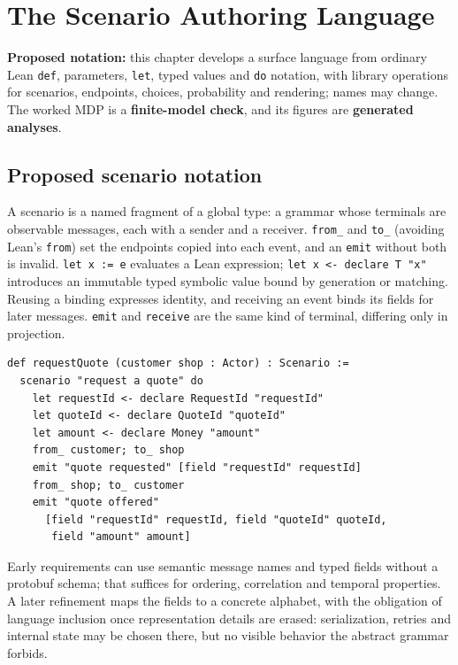 \chapter{The Scenario Authoring Language}
\label{ch:authoring-language}

\textbf{Proposed notation:} this chapter develops a surface language from ordinary
Lean \texttt{def}, parameters, \texttt{let}, typed values and \texttt{do} notation,
with library operations for scenarios, endpoints, choices, probability and
rendering; names may change. The worked MDP is a \textbf{finite-model check}, and
its figures are \textbf{generated analyses}.

\section{Proposed scenario notation}

A scenario is a named fragment of a global type: a grammar whose terminals are
observable messages, each with a sender and a receiver. \texttt{from\_} and
\texttt{to\_} (avoiding Lean's \texttt{from}) set the endpoints copied into each
event, and an \texttt{emit} without both is invalid. \texttt{let x := e} evaluates
a Lean expression; \texttt{let x <- declare T "x"} introduces an immutable typed
symbolic value bound by generation or matching. Reusing a binding expresses
identity, and receiving an event binds its fields for later messages.
\texttt{emit} and \texttt{receive} are the same kind of terminal, differing only
in projection.

\begin{lstlisting}
def requestQuote (customer shop : Actor) : Scenario :=
  scenario "request a quote" do
    let requestId <- declare RequestId "requestId"
    let quoteId <- declare QuoteId "quoteId"
    let amount <- declare Money "amount"
    from_ customer; to_ shop
    emit "quote requested" [field "requestId" requestId]
    from_ shop; to_ customer
    emit "quote offered"
      [field "requestId" requestId, field "quoteId" quoteId,
       field "amount" amount]
\end{lstlisting}

Early requirements can use semantic message names and typed fields without a
protobuf schema; that suffices for ordering, correlation and temporal properties.
A later refinement maps the fields to a concrete alphabet, with the obligation of
language inclusion once representation details are erased: serialization, retries
and internal state may be chosen there, but no visible behavior the abstract
grammar forbids.

